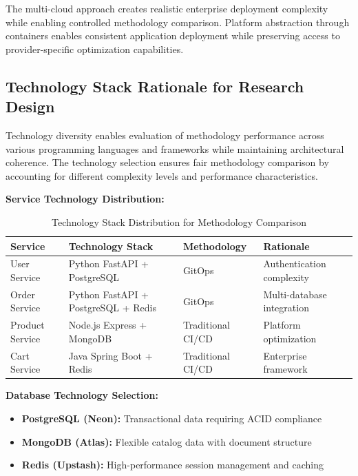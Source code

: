 The multi-cloud approach creates realistic enterprise deployment complexity while enabling controlled methodology comparison. Platform abstraction through containers enables consistent application deployment while preserving access to provider-specific optimization capabilities.

\subsection{Technology Stack Rationale for Research Design}

Technology diversity enables evaluation of methodology performance across various programming languages and frameworks while maintaining architectural coherence. The technology selection ensures fair methodology comparison by accounting for different complexity levels and performance characteristics.

\textbf{Service Technology Distribution:}

\begin{table}[h]
\centering
\caption{Technology Stack Distribution for Methodology Comparison}
\label{tab:tech_stack_distribution}
\renewcommand{\arraystretch}{1.2}
\small
\begin{tabular}{|p{2.3cm}|p{4.2cm}|p{2.4cm}|p{3.5cm}|}
\hline
\textbf{Service} & \textbf{Technology Stack} & \textbf{Methodology} & \textbf{Rationale} \\
\hline
User Service & Python FastAPI + PostgreSQL & GitOps & Authentication complexity \\
\hline
Order Service & Python FastAPI + PostgreSQL + Redis & GitOps & Multi-database integration \\
\hline
Product Service & Node.js Express + MongoDB & Traditional CI/CD & Platform optimization \\
\hline
Cart Service & Java Spring Boot + Redis & Traditional CI/CD & Enterprise framework \\
\hline
\end{tabular}
\end{table}
\textbf{Database Technology Selection:}
\begin{itemize}
\item \textbf{PostgreSQL (Neon):} Transactional data requiring ACID compliance
\item \textbf{MongoDB (Atlas):} Flexible catalog data with document structure
\item \textbf{Redis (Upstash):} High-performance session management and caching
\end{itemize}

